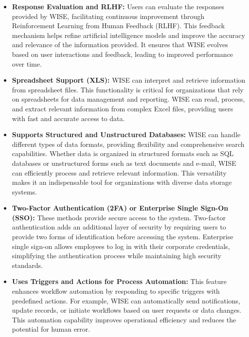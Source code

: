 \begin{itemize}
    \item \textbf{Response Evaluation and RLHF:} Users can evaluate the responses provided by WISE, facilitating continuous improvement through Reinforcement Learning from Human Feedback (RLHF). This feedback mechanism helps refine artificial intelligence models and improve the accuracy and relevance of the information provided. It ensures that WISE evolves based on user interactions and feedback, leading to improved performance over time.
    
    \item \textbf{Spreadsheet Support (XLS):} WISE can interpret and retrieve information from spreadsheet files. This functionality is critical for organizations that rely on spreadsheets for data management and reporting. WISE can read, process, and extract relevant information from complex Excel files, providing users with fast and accurate access to data.
    
    \item \textbf{Supports Structured and Unstructured Databases:} WISE can handle different types of data formats, providing flexibility and comprehensive search capabilities. Whether data is organized in structured formats such as SQL databases or unstructured forms such as text documents and e-mail, WISE can efficiently process and retrieve relevant information. This versatility makes it an indispensable tool for organizations with diverse data storage systems.
    
    \item \textbf{Two-Factor Authentication (2FA) or Enterprise Single Sign-On (SSO):} These methods provide secure access to the system. Two-factor authentication adds an additional layer of security by requiring users to provide two forms of identification before accessing the system. Enterprise single sign-on allows employees to log in with their corporate credentials, simplifying the authentication process while maintaining high security standards.
    
    \item \textbf{Uses Triggers and Actions for Process Automation:} This feature enhances workflow automation by responding to specific triggers with predefined actions. For example, WISE can automatically send notifications, update records, or initiate workflows based on user requests or data changes. This automation capability improves operational efficiency and reduces the potential for human error.
\end{itemize}

